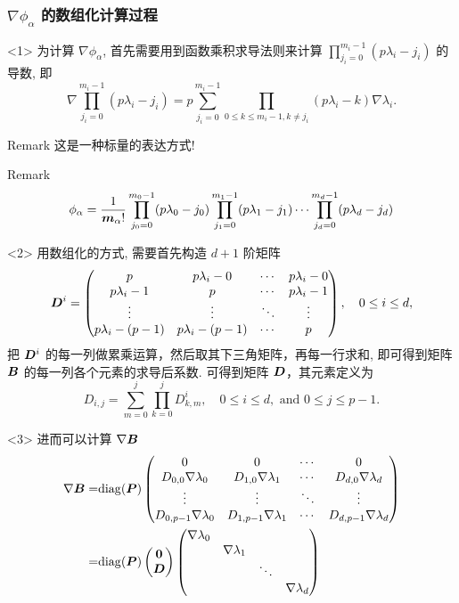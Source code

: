 \documentclass{beamer}
\numberwithin{subsection}{section}
\begin{document}
\begin{frame}
    \frametitle{$\nabla\phi_\alpha$ 的数组化计算过程}
\begin{onlyenv}<1>
为计算 $\nabla\phi_\alpha$, 首先需要用到函数乘积求导法则来计算 $\prod_{j_i =
0}^{m_i - 1} (p\lambda_i - j_i)$ 的导数, 即
\begin{equation*}
    \nabla \prod_{j_i = 0}^{m_i - 1} (p\lambda_i - j_i)
    = p\sum_{j_i=0}^{m_i - 1}
    \prod_{0\le k \le m_i-1, k\not= j_i}(p\lambda_i - k)\nabla \lambda_i.
\end{equation*}
\begin{block}{Remark}
    这是一种标量的表达方式!
\end{block}
\begin{block}{Remark}
$$
 \phi_{\alpha} = 
 \frac{1}{{\boldsymbol m}_\alpha!}
 \prod_{j_0 = 0}^{m_0 - 1} (p\lambda_0 - j_0)
 \prod_{j_1 = 0}^{m_1 - 1} (p\lambda_1 - j_1)
 \cdots
 \prod_{j_d = 0}^{m_{d} - 1} (p\lambda_d - j_d)
$$
\end{block}
\end{onlyenv}
\begin{onlyenv}<2>
用数组化的方式, 需要首先构造 $d+1$ 阶矩阵 
$$
{\boldsymbol D}^i = 
\begin{pmatrix}
p & p\lambda_i-0 & \cdots & p\lambda_i-0 \\
p\lambda_i - 1 & p & \cdots & p\lambda_i - 1 \\
\vdots & \vdots & \ddots & \vdots \\
p\lambda_i - (p-1) & p\lambda_i - (p-1) & \cdots & p 
\end{pmatrix}
, \quad 0 \le i \le d, 
$$
把 ${\boldsymbol D}^i$  的每一列做累乘运算，然后取其下三角矩阵，再每一行求和, 即可得到矩阵
${\boldsymbol B}$ 的每一列各个元素的求导后系数. 可得到矩阵 ${\boldsymbol D}$，其元素定义为
$$
D_{i,j} = \sum_{m=0}^j\prod_{k=0}^j D^i_{k, m},\quad 0 \le i \le d,
\text{ and }0 \le j \le p-1.
$$
\end{onlyenv}
\begin{onlyenv}<3>
进而可以计算 $\nabla{\boldsymbol B}$ 
$$
\begin{aligned}
\nabla {\boldsymbol B} = & \mathrm{diag}({\boldsymbol P})
\begin{pmatrix}
0 & 0 & \cdots & 0 \\
D_{0,0} \nabla \lambda_0 &
D_{1,0} \nabla \lambda_1 & \cdots&
D_{d,0} \nabla \lambda_d \\
\vdots & \vdots & \ddots & \vdots \\
D_{0, p-1} \nabla \lambda_0 &
D_{1, p-1} \nabla \lambda_1 & \cdots &
D_{d, p-1} \nabla \lambda_d
\end{pmatrix}\\
= & \mathrm{diag}({\boldsymbol P})
\begin{pmatrix}
\mathbf 0\\
{\boldsymbol D}
\end{pmatrix}
\begin{pmatrix}
\nabla \lambda_0 &  &  & \\
 & \nabla \lambda_1 & & \\
 & & \ddots & \\
 & & & \nabla \lambda_d
\end{pmatrix}\\
\end{aligned}
$$
\end{onlyenv}
\end{frame}
\end{document}
